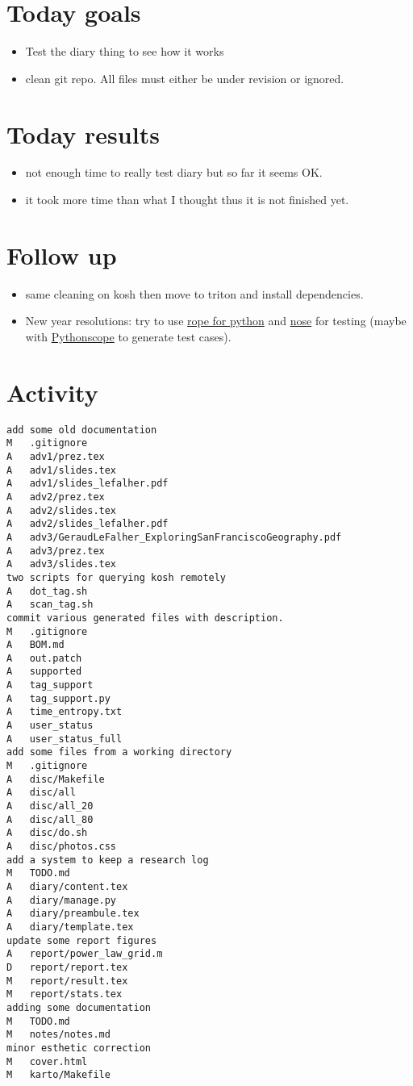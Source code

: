 \section*{Today goals}
\begin{itemize}
	\item Test the diary thing to see how it works
	\item clean git repo. All files must either be under revision or ignored.
\end{itemize}

\section*{Today results}
\begin{itemize}
	\item not enough time to really test diary but so far it seems OK.
	\item it took more time than what I thought thus it is not finished yet.
\end{itemize}

\section*{Follow up}
\begin{itemize}
	\item same cleaning on kosh then move to triton and install dependencies.
	\item New year resolutions: try to use
		\href{http://rope.sourceforge.net/}{rope for python} and
		\href{https://nose.readthedocs.org/en/latest/}{nose} for testing
		(maybe with \href{http://pythoscope.org/start}{Pythonscope} to
		generate test cases).
\end{itemize}

\section*{Activity}
\begin{verbatim}
add some old documentation
M	.gitignore
A	adv1/prez.tex
A	adv1/slides.tex
A	adv1/slides_lefalher.pdf
A	adv2/prez.tex
A	adv2/slides.tex
A	adv2/slides_lefalher.pdf
A	adv3/GeraudLeFalher_ExploringSanFranciscoGeography.pdf
A	adv3/prez.tex
A	adv3/slides.tex
two scripts for querying kosh remotely
A	dot_tag.sh
A	scan_tag.sh
commit various generated files with description.
M	.gitignore
A	BOM.md
A	out.patch
A	supported
A	tag_support
A	tag_support.py
A	time_entropy.txt
A	user_status
A	user_status_full
add some files from a working directory
M	.gitignore
A	disc/Makefile
A	disc/all
A	disc/all_20
A	disc/all_80
A	disc/do.sh
A	disc/photos.css
add a system to keep a research log
M	TODO.md
A	diary/content.tex
A	diary/manage.py
A	diary/preambule.tex
A	diary/template.tex
update some report figures
A	report/power_law_grid.m
D	report/report.tex
M	report/result.tex
M	report/stats.tex
adding some documentation
M	TODO.md
M	notes/notes.md
minor esthetic correction
M	cover.html
M	karto/Makefile
\end{verbatim}